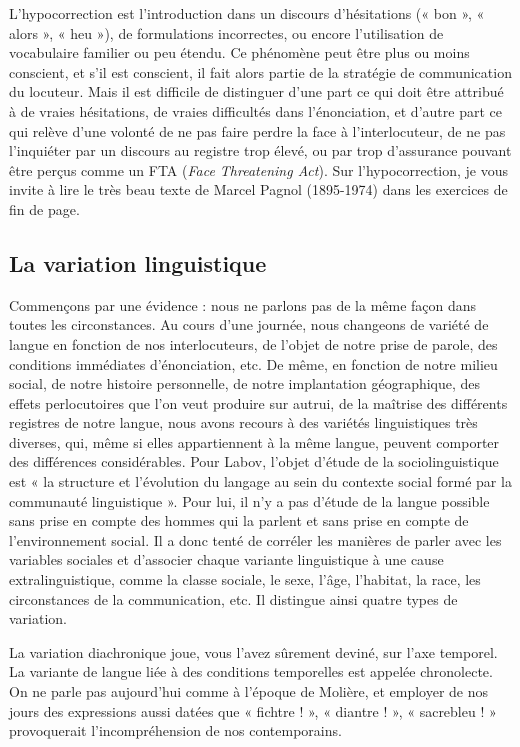 L’hypocorrection est l’introduction dans un discours d’hésitations (« bon », « alors », « heu »), de formulations incorrectes, ou encore l’utilisation de vocabulaire familier ou peu étendu. Ce phénomène peut être plus ou moins conscient, et s’il est conscient, il fait alors partie de la stratégie de communication du locuteur. Mais il est difficile de distinguer d’une part ce qui doit être attribué à de vraies hésitations, de vraies difficultés dans l’énonciation, et d’autre part ce qui relève d’une volonté de ne pas faire perdre la face à l’interlocuteur, de ne pas l’inquiéter par un discours au registre trop élevé, ou par trop d’assurance pouvant être perçus comme un FTA (\textit{Face Threatening
Act}). Sur l’hypocorrection, je vous invite à lire le très beau texte de Marcel Pagnol (1895-1974) dans les exercices de fin de page.

\subsection{La variation linguistique}
Commençons par une évidence : nous ne parlons pas de la même façon dans toutes les circonstances. Au cours d’une journée, nous changeons de variété de langue en fonction de nos interlocuteurs, de l’objet de notre prise de parole, des conditions immédiates d’énonciation, etc. De même, en fonction de notre milieu social, de notre histoire personnelle, de notre implantation géographique, des effets perlocutoires que l’on veut produire sur autrui, de la maîtrise des différents registres de notre langue, nous avons recours à des variétés linguistiques très diverses, qui, même si elles appartiennent à la même langue, peuvent comporter des différences considérables. Pour Labov, l’objet d’étude de la sociolinguistique est « la structure et l’évolution du langage au sein du contexte social formé par la communauté linguistique ». Pour lui, il n’y a pas d’étude de la langue possible sans prise en compte des hommes qui la parlent et sans prise en compte de l’environnement social. Il a donc tenté de corréler les manières de parler avec les variables sociales et d’associer chaque variante linguistique à une cause extralinguistique, comme la classe sociale, le sexe, l’âge, l’habitat, la race, les circonstances de la communication, etc. Il distingue ainsi quatre types de variation.

La variation diachronique joue, vous l’avez sûrement deviné, sur l’axe temporel. La variante de langue liée à des conditions temporelles est appelée chronolecte. On ne parle pas aujourd’hui comme à l’époque de Molière, et employer de nos jours des expressions aussi datées que « fichtre ! », « diantre ! », « sacrebleu ! » provoquerait l’incompréhension de nos contemporains.

